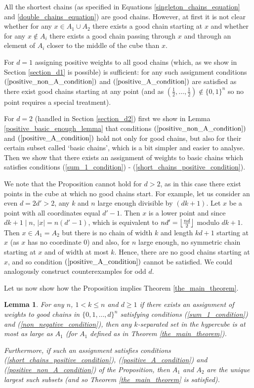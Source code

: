 \documentclass[11pt, reqno]{amsart}
\newcommand{\leanblueprintbase}{https://mj141592.github.io/weighted-chains-paper}
\newif\ifleanlinks
\newcommand{\leanblueprint}[1]{%
  \ifleanlinks
    \leavevmode\unskip\penalty9999\hbox{}\nobreak\hfill\quad
    \href{\leanblueprintbase/theorems/#1/}{%
      \mbox{\normalfont\footnotesize\textcolor{blue}{[\textsf{Lean formalisation}]}}}%
    \par\nobreak
  \fi
}
\newtheorem{lemma}[theorem]{Lemma}
\theoremstyle{remark}
\numberwithin{equation}{section}
\newcommand{\thehypercube}{\{0, 1, \ldots, d\}^n}
\newcommand{\fclass}{\mathchoice
  {\left\lfloor \frac{nd}{2} \right\rfloor}
  {\big\lfloor \frac{nd}{2} \big\rfloor}
  {\big\lfloor \frac{nd}{2} \big\rfloor}
  {\big\lfloor \frac{nd}{2} \big\rfloor}}
\begin{document}
All the shortest chains (as specified in Equations \ref{singleton_chains_equation} and \ref{double_chains_equation}) are good chains. However, at first it is not clear whether for any $x \in A_1 \cup A_2$ there exists a good chain starting at $x$ and whether for any $x \notin A_i$ there exists a good chain passing through $x$ and through an element of $A_i$ closer to the middle of the cube than $x$.

For $d=1$ assigning positive weights to all good chains (which, as we show in Section \ref{section_d1} is possible) is sufficient: for any such assignment conditions $(\ref{positive_non_A_condition})$ and $(\ref{positive_A_condition})$ are satisfied as there exist good chains starting at any point (and as $(\frac{1}{2}, \dots, \frac{1}{2}) \notin \{0,1\}^n$ so no point requires a special treatment).

For $d=2$ (handled in Section \ref{section_d2}) first we show in Lemma \ref{positive_basic_enough_lemma} that conditions $(\ref{positive_non_A_condition})$ and $(\ref{positive_A_condition})$ hold not only for good chains, but also for their certain subset called `basic chains', which is a bit simpler and easier to analyse. Then we show that there exists an assignment of weights to basic chains which satisfies conditions (\ref{sum_1_condition}) - (\ref{short_chains_positive_condition}).

We note that the Proposition cannot hold for $d > 2$, as in this case there exist points in the cube at which no good chains start. For example, let us consider an even $d=2d'>2$, any $k$ and $n$ large enough divisible by $(dk+1)$. Let $x$ be a point with all coordinates equal $d'-1$. Then $x$ is a lower point and since $dk+1 \mid n$, $|x|=n(d'-1)$, which is equivalent to $nd' = \fclass$ modulo $dk+1$. Then $x \in A_1=A_2$ but there is no chain of width $k$ and length $kd+1$ starting at $x$ (as $x$ has no coordinate $0$) and also, for $n$ large enough, no symmetric chain starting at $x$ and of width at most $k$. Hence, there are no good chains starting at $x$, and so condition $(\ref{positive_A_condition})$ cannot be satisfied. We could analogously construct counterexamples for odd $d$.

Let us now show how the Proposition implies Theorem \ref{the_main_theorem}.

\begin{lemma}
\label{wc:lem:weighted-cover-implies-main}
\label{weights_imply_theorem_lemma}
    For any $n$, $1 < k \leqslant n$ and $d \geqslant 1$ if there exists an assignment of weights to good chains in $\thehypercube$ satisfying conditions (\ref{sum_1_condition}) and (\ref{non_negative_condition}), then any $k$-separated set in the hypercube is at most as large as $A_1$ (for $A_1$ defined as in Theorem \ref{the_main_theorem}).

    Furthermore, if such an assignment satisfies conditions (\ref{short_chains_positive_condition}), (\ref{positive_A_condition}) and (\ref{positive_non_A_condition}) of the Proposition, then $A_1$ and $A_2$ are the unique largest such subsets (and so Theorem \ref{the_main_theorem} is satisfied).
\leanblueprint{weighted-cover-implies-main}
\end{lemma}
\end{document}
